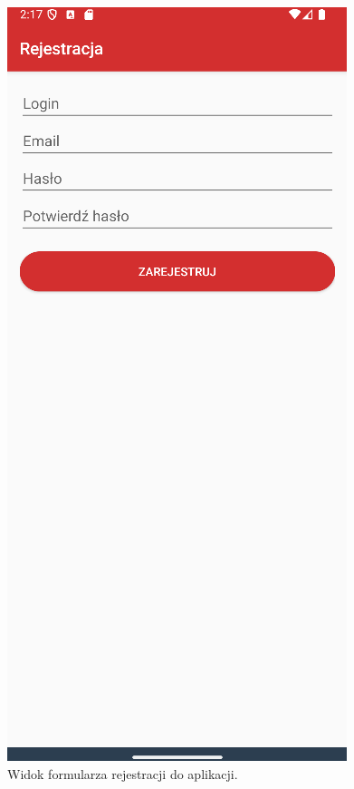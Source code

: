 \begin{figure}[H]
    \centering
    \includegraphics[scale=0.5]{img/imp/widok-reje.png}
    \caption{Widok formularza rejestracji do aplikacji.}
    \label{widok:register}
\end{figure}
